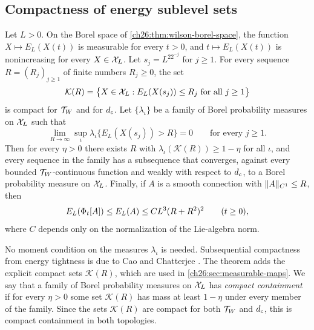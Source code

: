 \subsection{Compactness of energy sublevel sets}

\begin{theorem}\label{ch26:thm:energy-compact-containment}
Let $L>0$. On the Borel space of \cref{ch26:thm:wilson-borel-space}, the function $X\mapsto E_L(X(t))$ is measurable for every $t>0$, and $t\mapsto E_L(X(t))$ is nonincreasing for every $X\in\mathcal X_L$. Let $s_j=L^22^{-j}$ for $j\ge1$. For every sequence $R=(R_j)_{j\ge1}$ of finite numbers $R_j\ge0$, the set
\[
 \mathcal K(R)=\bigl\{X\in\mathcal X_L:E_L(X(s_j))\le R_j\text{ for all }j\ge1\bigr\}
\]
is compact for $\mathcal T_W$ and for $d_c$. Let $\{\lambda_\iota\}$ be a family of Borel probability measures on $\mathcal X_L$ such that
\[
 \lim_{R\to\infty}\sup_\iota\lambda_\iota\bigl\{E_L(X(s_j))>R\bigr\}=0\qquad\text{for every }j\ge1 .
\]
Then for every $\eta>0$ there exists $R$ with $\lambda_\iota(\mathcal K(R))\ge1-\eta$ for all $\iota$, and every sequence in the family has a subsequence that converges, against every bounded $\mathcal T_W$-continuous function and weakly with respect to $d_c$, to a Borel probability measure on $\mathcal X_L$. Finally, if $A$ is a smooth connection with $\lVert A\rVert_{C^1}\le R$, then
\[
 E_L(\Phi_t[A])\le E_L(A)\le CL^3(R+R^2)^2\qquad(t\ge0),
\]
where $C$ depends only on the normalization of the Lie-algebra norm.
\end{theorem}

No moment condition on the measures $\lambda_\iota$ is needed. Subsequential compactness from energy tightness is due to Cao and Chatterjee \cite[Theorem 1.6, p.~7]{CCState2023v4}. The theorem adds the explicit compact sets $\mathcal K(R)$, which are used in \cref{ch26:sec:measurable-maps}. We say that a family of Borel probability measures on $\mathcal X_L$ has \emph{compact containment} if for every $\eta>0$ some set $\mathcal K(R)$ has mass at least $1-\eta$ under every member of the family. Since the sets $\mathcal K(R)$ are compact for both $\mathcal T_W$ and $d_c$, this is compact containment in both topologies.

